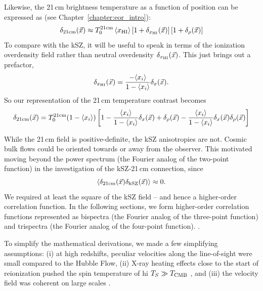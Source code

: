 Likewise, the 21\,cm brightness temperature as a function of position can be expressed as (see Chapter~\ref{chapter:eor_intro}):
\begin{equation}
\delta_{\rm 21cm}(\vec{x}) \approx T_0^{\rm 21cm} \left\langle x_{\rm HI} \right\rangle \left[1 + \delta_{x_{\rm HI}}(\vec{x})\right] \left[1 + \delta_\rho(\vec{x})\right]
\label{eq:d21cm}
\end{equation}
To compare with the kSZ, it will be useful to speak in terms of the ionization overdensity field rather than neutral overdensity $\delta_{x_{\rm HI}}(\vec{x})$. This just brings out a prefactor,
\begin{equation}
\delta_{x_{\rm HI}}(\vec{x}) = \frac{-\langle x_i \rangle}{1 - \langle x_i \rangle} \delta_x(\vec{x}).
\end{equation}
So our representation of the 21\,cm temperature contrast becomes
\begin{equation}
\delta_{\rm 21cm}(\vec{x}) = T_0^{\rm21cm} (1 - \langle x_i \rangle ) \left[ 1 - \frac{\langle x_i \rangle}{1 - \langle x_i \rangle} \delta_x(\vec{x}) + \delta_{\rho}(\vec{x})  - \frac{\langle x_i \rangle}{1 - \langle x_i \rangle} \delta_x(\vec{x}) \delta_{\rho}(\vec{x}) \right]
\label{eq:d21cm_x}
\end{equation}

While the 21\,cm field is positive-definite, the kSZ anisotropies are not. Cosmic bulk flows could be oriented towards or away from the observer. This motivated moving beyond the power spectrum (the Fourier analog of the two-point function) in the investigation of the kSZ-21\,cm connection, since
\begin{equation}
\left\langle \delta_{\rm 21cm}(\vec{x}) \delta_{\rm kSZ}(\vec{x}) \right\rangle \approx 0.
\end{equation}
We required at least the square of the kSZ field -- and hence a higher-order correlation function.
In the following sections, we form higher-order correlation functions represented as bispectra (the Fourier analog of the three-point function) and trispectra (the Fourier analog of the four-point function). . 

To simplify the mathematical derivations, we made a few simplifying assumptions: (i) at high redshifts, peculiar velocities along the line-of-sight were small compared to the Hubble Flow, (ii) X-ray heating effects close to the start of reionization pushed the spin temperature of {\sc hi} $T_S \gg T_{\rm CMB}$ \citep[e.g.][]{Meiksin.17}, and (iii) the velocity field was coherent on large scales \citep[e.g.][]{Smith.16}.

